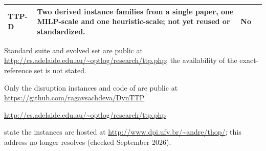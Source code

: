 \begin{table}[htbp]
\begin{threeparttable}
\begin{tabular}{@{}lp{10.0cm}cp{3.5cm}@{}}
TTP-D & Two derived instance families from a single paper, one MILP-scale and one heuristic-scale; not yet reused or standardized. & No & \citet{murjani2026drive} \\
\bottomrule
\end{tabular}
\begin{tablenotes}\footnotesize
\item[a] Standard suite and evolved set are public at \url{http://cs.adelaide.edu.au/~optlog/research/ttp.php}; the availability of the exact-reference set is not stated.
\item[b] Only the disruption instances and code of \citet{sachdeva2020dynamic} are public at \url{https://github.com/ragavsachdeva/DynTTP}
\item[c] \url{http://cs.adelaide.edu.au/~optlog/research/ttp.php}
\item[d] \citet{santos2018thief} state the instances are hosted at \url{http://www.dpi.ufv.br/~andre/thop/}; this address no longer resolves (checked September 2026).
\end{tablenotes}
\end{threeparttable}
\end{table}
